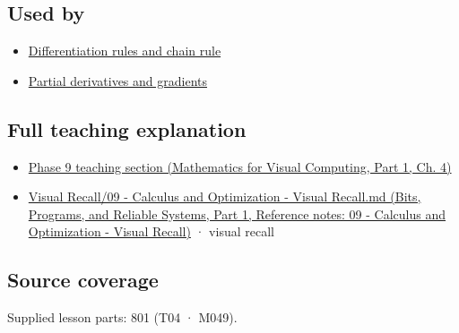 \subsection{Used by}\label{appendix-a59658325cd6-used-by}

\hypertarget{appendix-a59658325cd6-used-by}{}

\begin{itemize}
\tightlist
\item
  \hyperref[appendix-d9f70bdfbc92]{Differentiation rules and chain rule}
\item
  \hyperref[appendix-677b59746ae0]{Partial derivatives and gradients}
\end{itemize}

\subsection{Full teaching explanation}\label{appendix-a59658325cd6-full-teaching-explanation}

\hypertarget{appendix-a59658325cd6-full-teaching-explanation}{}

\begin{itemize}
\tightlist
\item
  \href{../02-Mathematics-for-Visual-Computing-P01/main.pdf\#nameddest=01-foundations-i-ch020-functions-limits-continuity-and-scalar-change}{Phase 9 teaching section (Mathematics for Visual Computing, Part 1, Ch. 4)}
\item
  \href{../01-Bits-Programs-and-Reliable-Systems-P01/main.pdf\#nameddest=appendix-adf48f5dc5c1}{Visual Recall/09 - Calculus and Optimization - Visual Recall.md (Bits, Programs, and Reliable Systems, Part 1, Reference notes: 09 - Calculus and Optimization - Visual Recall)} · visual recall
\end{itemize}

\subsection{Source coverage}\label{appendix-a59658325cd6-source-coverage}

\hypertarget{appendix-a59658325cd6-source-coverage}{}

Supplied lesson parts: 801 (T04 · M049).
